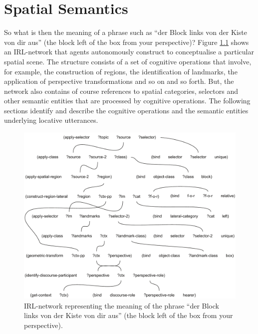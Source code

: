 \chapter{Spatial Semantics}
\label{s:german-space-semantics}
So what is then the meaning of a phrase such as 
``der Block links von der Kiste von dir aus'' 
(the block left of the box from your perspective)?
Figure \ref{f:semantic-structure-der-block-links-der-kiste-von-dir-aus}
shows an IRL-network that agents autonomously construct to conceptualise
a particular spatial scene. The structure consists
of a set of cognitive operations that involve, for example, the construction of regions, 
the identification of landmarks, the application of perspective transformations and so on 
and so forth. But, the network also contains of course references to spatial
categories, selectors and other semantic entities that are processed by cognitive
operations. The following sections identify and describe the cognitive operations
and the semantic entities underlying locative utterances.

\begin{figure}
\includegraphics[width=1\columnwidth]{figs/semantic-structure-der-block-links-der-kiste-von-dir-aus}
\caption[Semantic structure of the phrase
``der Block links von der Kiste von dir aus'' 
(the block left of the box from your perspective)]{
IRL-network representing the meaning of the phrase 
``der Block links von der Kiste von dir aus'' 
(the block left of the box from your perspective).}
\label{f:semantic-structure-der-block-links-der-kiste-von-dir-aus}
\end{figure}

